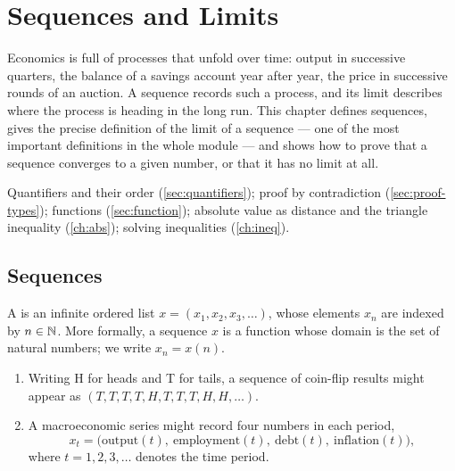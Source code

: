 \chapter{Sequences and Limits}\label{ch:limits}

\begin{chapterintro}
Economics is full of processes that unfold over time: output in successive quarters, the balance of a savings account
year after year, the price in successive rounds of an auction. A sequence records such a process, and its limit
describes where the process is heading in the long run. This chapter defines sequences, gives the precise definition of
the limit of a sequence --- one of the most important definitions in the whole module --- and shows how to prove that a
sequence converges to a given number, or that it has no limit at all.
\end{chapterintro}

\begin{prerequisites}
Quantifiers and their order (\cref{sec:quantifiers}); proof by contradiction (\cref{sec:proof-types}); functions
(\cref{sec:function}); absolute value as distance and the triangle inequality (\cref{ch:abs}); solving inequalities
(\cref{ch:ineq}).
\end{prerequisites}

\section{Sequences}\label{sec:sequences}

\begin{definition}
A  is an infinite ordered list $x=(x_1,x_2,x_3,\dots)$, whose elements $x_n$ are indexed by $n\in\mathbb{N}$.
More formally, a sequence $x$ is a function whose domain is the set of natural numbers; we write $x_n=x(n)$.
\end{definition}

\begin{example}
\begin{enumerate}
  \item Writing H for heads and T for tails, a sequence of coin-flip results might appear as
  $(T,T,T,T,H,T,T,T,H,H,\dots)$.
  \item A macroeconomic series might record four numbers in each period,
  \[x_t=\big(\text{output}(t),\ \text{employment}(t),\ \text{debt}(t),\ \text{inflation}(t)\big),\]
  where $t=1,2,3,\dots$ denotes the time period.
\end{enumerate}
\end{example}

